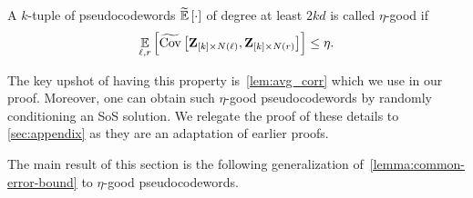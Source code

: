 \begin{definition}
    A $k$-tuple of pseudocodewords $\tildeEx{\cdot}$ of degree at least $2kd$ is called $\eta$-good if
    \[
        \Ex{\li,\ri}{\tildeCov{\zee_{[k]\times N(\li)}}{\zee_{[k]\times N(\ri)}}} \leq \eta.
    \]
\end{definition}

The key upshot of having this property is~\cref{lem:avg_corr} which we use in our proof.  Moreover, one can obtain such $\eta$-good pseudocodewords by randomly conditioning an SoS solution. We relegate the proof of these details to \cref{sec:appendix} as they are an adaptation of earlier proofs.

%
%



The main result of this section is the following generalization of~\cref{lemma:common-error-bound} to $\eta$-good pseudocodewords.

